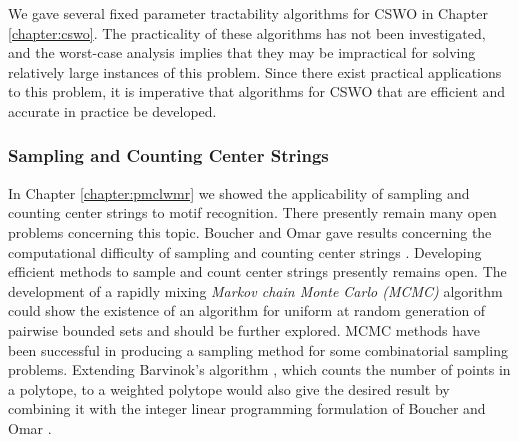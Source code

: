 We gave several fixed parameter tractability algorithms for {\sc CSWO} in Chapter \ref{chapter:cswo}.  The practicality of these algorithms has not been investigated, and the worst-case analysis implies that they may be impractical for solving relatively large instances of this problem.  Since there exist practical applications to this problem, it is imperative that algorithms for {\sc CSWO} that are efficient and accurate in practice be developed.

\subsubsection{Sampling and Counting Center Strings}

In Chapter \ref{chapter:pmclwmr} we showed the applicability of sampling and counting center strings to motif recognition.  There presently remain many open problems concerning this topic. Boucher and Omar gave results concerning the computational difficulty of sampling and counting center strings \cite{boucher_omar}. Developing efficient methods to sample and count center strings presently remains open.  The development of a rapidly mixing {\em Markov chain Monte Carlo (MCMC)} algorithm could show the existence of an algorithm for uniform at random generation of pairwise bounded sets and should be further explored.  MCMC methods have been successful in producing a sampling method for some combinatorial sampling problems. Extending Barvinok's algorithm \cite{barvinok}, which counts the number of points in a polytope, to a weighted polytope would also give the desired result by combining it with the integer linear programming formulation of Boucher and Omar \cite{boucher_omar}. 